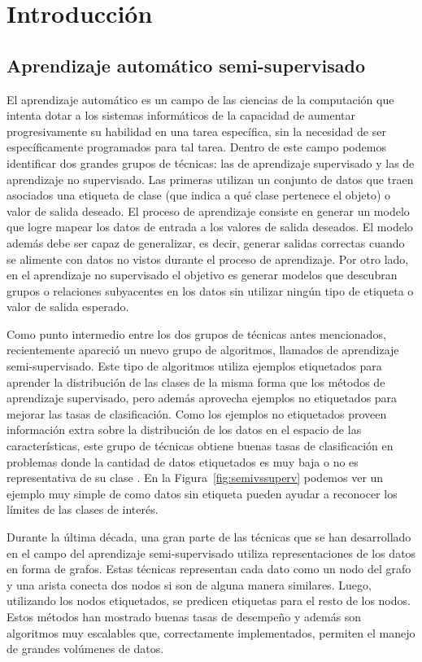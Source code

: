 \newpage
\chapter{Introducción}
\section{Aprendizaje automático semi-supervisado}

El aprendizaje automático es un campo de las ciencias de la computación que intenta dotar a los sistemas informáticos de la capacidad de aumentar
progresivamente su habilidad en una tarea específica, sin la necesidad de ser específicamente programados para tal tarea. Dentro de este campo podemos
identificar dos grandes grupos de técnicas: las de aprendizaje supervisado y las de aprendizaje no supervisado. Las primeras utilizan un conjunto de datos que
traen asociados una etiqueta de clase (que indica a qué clase pertenece el objeto) o valor de salida deseado. El proceso de aprendizaje consiste en generar un
modelo que logre mapear los datos de entrada a los valores de salida deseados. El modelo además debe ser capaz de generalizar, es decir, generar salidas correctas
cuando se alimente con datos no vistos durante el proceso de aprendizaje. Por otro lado, en el aprendizaje no supervisado el objetivo es generar modelos que
descubran grupos o relaciones subyacentes en los datos sin utilizar ningún tipo de etiqueta o valor de salida esperado.

Como punto intermedio entre los dos grupos de técnicas antes mencionados, recientemente apareció un nuevo grupo de algoritmos, llamados de aprendizaje
semi-supervisado. Este tipo de algoritmos utiliza ejemplos etiquetados para aprender la distribución de las clases de la misma forma que los métodos de
aprendizaje supervisado, pero además aprovecha ejemplos no etiquetados para mejorar las tasas de clasificación. Como los ejemplos no etiquetados proveen
información extra sobre la distribución de los datos en el espacio de las características, este grupo de técnicas obtiene buenas tasas de clasificación en
problemas donde la cantidad de datos etiquetados es muy baja o no es representativa de su clase \citep{chapelle2006semi}. En la Figura~\ref{fig:semivssuperv}
podemos ver un ejemplo muy simple de como datos sin etiqueta pueden ayudar a reconocer los límites de las clases de interés.

Durante la última década, una gran parte de las técnicas que se han desarrollado en el campo del aprendizaje semi-supervisado utiliza representaciones de
los datos en forma de grafos. Estas técnicas representan cada dato como un nodo del grafo y una arista conecta dos nodos si son de alguna manera similares.
Luego, utilizando los nodos etiquetados, se predicen etiquetas para el resto de los nodos. Estos métodos han mostrado buenas tasas de desempeño
\citep{joachims2003transductive} y además son algoritmos muy escalables que, correctamente implementados, permiten el manejo de grandes volúmenes de datos.

